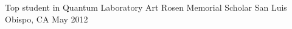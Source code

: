 
\begin{cvpoints}

  \cvpoint
    {Top student in Quantum Laboratory} %
    {Art Rosen Memorial Scholar} %
    {San Luis Obispo, CA} %
    {May 2012} %

\end{cvpoints}
